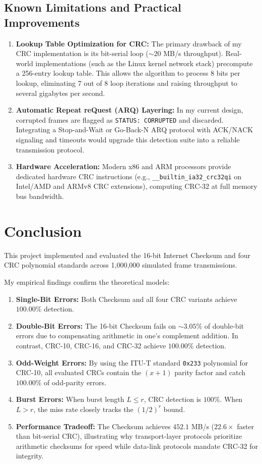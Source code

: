 \documentclass[12pt,a4paper]{article}
\begin{document}
\subsection{Known Limitations and Practical Improvements}
\begin{enumerate}[leftmargin=*]
    \item \textbf{Lookup Table Optimization for CRC:} The primary drawback of my CRC implementation is its bit-serial loop ($\sim20$ MB/s throughput). Real-world implementations (such as the Linux kernel network stack) precompute a 256-entry lookup table. This allows the algorithm to process 8 bits per lookup, eliminating 7 out of 8 loop iterations and raising throughput to several gigabytes per second.
    \item \textbf{Automatic Repeat reQuest (ARQ) Layering:} In my current design, corrupted frames are flagged as \texttt{STATUS: CORRUPTED} and discarded. Integrating a Stop-and-Wait or Go-Back-N ARQ protocol with ACK/NACK signaling and timeouts would upgrade this detection suite into a reliable transmission protocol.
    \item \textbf{Hardware Acceleration:} Modern x86 and ARM processors provide dedicated hardware CRC instructions (e.g., \texttt{\_\_builtin\_ia32\_crc32qi} on Intel/AMD and ARMv8 CRC extensions), computing CRC-32 at full memory bus bandwidth.
\end{enumerate}

\section{Conclusion}

This project implemented and evaluated the 16-bit Internet Checksum and four CRC polynomial standards across 1,000,000 simulated frame transmissions.

My empirical findings confirm the theoretical models:
\begin{enumerate}[leftmargin=*]
    \item \textbf{Single-Bit Errors:} Both Checksum and all four CRC variants achieve $100.00\%$ detection.
    \item \textbf{Double-Bit Errors:} The 16-bit Checksum fails on $\sim3.05\%$ of double-bit errors due to compensating arithmetic in one's complement addition. In contrast, CRC-10, CRC-16, and CRC-32 achieve $100.00\%$ detection.
    \item \textbf{Odd-Weight Errors:} By using the ITU-T standard \texttt{0x233} polynomial for CRC-10, all evaluated CRCs contain the $(x+1)$ parity factor and catch $100.00\%$ of odd-parity errors.
    \item \textbf{Burst Errors:} When burst length $L \le r$, CRC detection is $100\%$. When $L > r$, the miss rate closely tracks the $(1/2)^r$ bound.
    \item \textbf{Performance Tradeoff:} The Checksum achieves $452.1$ MB/s ($22.6\times$ faster than bit-serial CRC), illustrating why transport-layer protocols prioritize arithmetic checksums for speed while data-link protocols mandate CRC-32 for integrity.
\end{enumerate}
\end{document}

